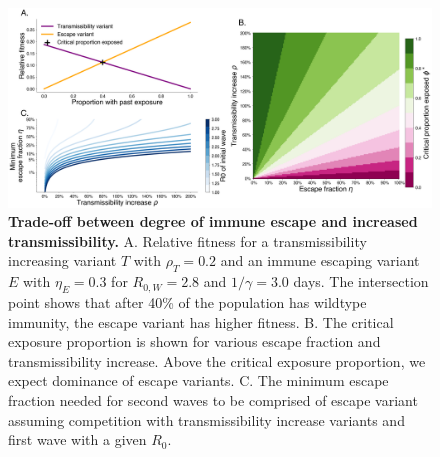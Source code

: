 \documentclass[11pt,oneside,letterpaper]{article}
\newcommand{\wt}{W}
\newcommand{\varEscape}{\eta}
\newcommand{\varTransmission}{\rho}
\def\tbc#1{\textcolor{purple}{[#1]}}
\begin{document}
\begin{figure}[h]
    \centering
    \includegraphics[width=1.0\linewidth]{./figures/transmission_tradeoff.png}
    \caption{
      \textbf{Trade-off between degree of immune escape and increased transmissibility.}
      A. Relative fitness for a transmissibility increasing variant $T$ with $\varTransmission_T=0.2$ and an immune escaping variant $E$ with $\varEscape_E=0.3$ for $R_{0, \wt}=2.8$ and $1 / \gamma = 3.0$ days.
      The intersection point shows that after 40\% of the population has wildtype immunity, the escape variant has higher fitness.
      B. The critical exposure proportion is shown for various escape fraction and transmissibility increase. Above the critical exposure proportion, we expect dominance of escape variants.
      C. The minimum escape fraction needed for second waves to be comprised of escape variant assuming competition with transmissibility increase variants and first wave with a given $R_{0}$.
    }
    \label{fig:transmission_tradeoff}
\end{figure}
\end{document}
